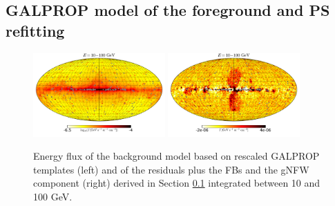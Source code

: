 \subsection{GALPROP model of the foreground and PS refitting}
\label{sec:galprop_model}


\begin{figure}[h]
\centering
\includegraphics[width=0.45\textwidth]{plots/Mollwiede_GALPROP_model_source_range2_log.pdf}
 \includegraphics[width=0.45\textwidth]{plots/Mollwiede_GALPROP_source_range2.pdf}
 \caption{Energy flux of the background model based on rescaled GALPROP templates (left)
 and of the residuals plus the FBs and the gNFW component (right) derived in Section \ref{sec:galprop_model}
 integrated between 10 and 100 GeV.}
 \label{fig:Maps_GALPROP}
\end{figure}

